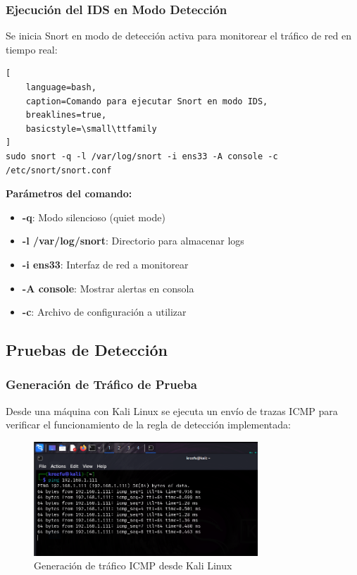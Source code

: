 \documentclass[12pt,a4paper]{article}
\begin{document}
\subsubsection{Ejecución del IDS en Modo Detección}

Se inicia Snort en modo de detección activa para monitorear el tráfico de red
en tiempo real:

\begin{lstlisting}[
    language=bash, 
    caption=Comando para ejecutar Snort en modo IDS,
    breaklines=true,
    basicstyle=\small\ttfamily
]
sudo snort -q -l /var/log/snort -i ens33 -A console -c /etc/snort/snort.conf
\end{lstlisting}

\textbf{Parámetros del comando:}
\begin{itemize}
  \item \textbf{-q}: Modo silencioso (quiet mode)
  \item \textbf{-l /var/log/snort}: Directorio para almacenar logs
  \item \textbf{-i ens33}: Interfaz de red a monitorear
  \item \textbf{-A console}: Mostrar alertas en consola
  \item \textbf{-c}: Archivo de configuración a utilizar
\end{itemize}

\subsection{Pruebas de Detección}

\subsubsection{Generación de Tráfico de Prueba}

Desde una máquina con Kali Linux se ejecuta un envío de trazas ICMP para
verificar el funcionamiento de la regla de detección implementada:

\begin{figure}[H]
  \centering
  \includegraphics[width=0.75\textwidth]{./assets/img17.png}
  \caption{Generación de tráfico ICMP desde Kali Linux}
  \label{fig:icmp-traffic}
\end{figure}
\end{document}
